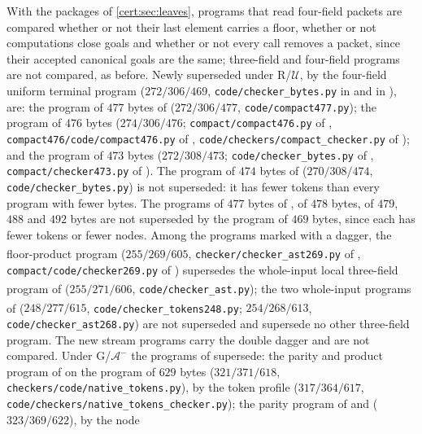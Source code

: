 With the packages of \cref{cert:sec:leaves}, programs that read four-field
packets are compared whether or not their last element carries a floor,
whether or not computations close goals and whether or not every call removes
a packet, since their accepted canonical goals are the same; three-field and
four-field programs are not compared, as before. Newly superseded under
R/$\mathcal U$, by the four-field uniform terminal program ($272/306/469$,
\texttt{code/checker\_bytes.py} in  and in
), are: the program of $477$ bytes of
 ($272/306/477$, \texttt{code/compact477.py}); the
program of $476$ bytes ($274/306/476$; \texttt{compact/compact476.py} of
, \texttt{compact476/code/compact476.py} of
, \texttt{code/checkers/compact\_checker.py} of
); and the program of $473$ bytes
($272/308/473$; \texttt{code/checker\_bytes.py} of ,
\texttt{compact/checker473.py} of ). The program of
$474$ bytes of  ($270/308/474$,
\texttt{code/checker\_bytes.py}) is not superseded: it has fewer tokens than
every program with fewer bytes. The programs of $477$ bytes of
, of $478$ bytes, of $479$, $488$ and $492$ bytes are
not superseded by the program of $469$ bytes, since each has fewer tokens or
fewer nodes. Among the programs marked with a dagger, the floor-product program
($255/269/605$\textsuperscript{\dag}, \texttt{checker/checker\_ast269.py} of
, \texttt{compact/code/checker269.py} of
) supersedes the whole-input local three-field
program of  ($255/271/606$\textsuperscript{\dag},
\texttt{code/checker\_ast.py}); the two whole-input programs of
 ($248/277/615$\textsuperscript{\dag},
\texttt{code/checker\_tokens248.py}; $254/268/613$\textsuperscript{\dag},
\texttt{code/checker\_ast268.py}) are not superseded and supersede no other
three-field program. The new stream programs carry the double dagger and are
not compared. Under G/$\mathcal A^{-}$ the programs of
 supersede: the parity and product program
of  on the program of $629$ bytes ($321/371/618$,
\texttt{checkers/code/native\_tokens.py}), by the token profile ($317/364/617$,
\texttt{code/checkers/native\_tokens\_checker.py}); the parity program of
 and  ($323/369/622$), by the node
